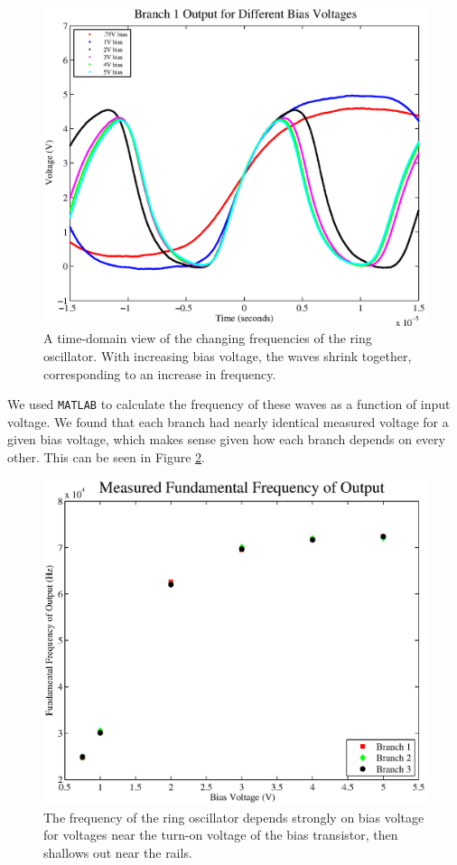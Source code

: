 \documentclass{article}
\begin{document}
\begin{figure}[H]
\centering
\includegraphics[scale=.6]{b1_out.eps}
\caption{A time-domain view of the changing frequencies of the ring oscillator. With increasing bias voltage, the waves shrink together, corresponding to an increase in frequency.}
\label{branch}
\end{figure}

We used \texttt{MATLAB} to calculate the frequency of these waves as a function of input voltage.  We found that each branch had nearly identical measured voltage for a given bias voltage, which makes sense given how each branch depends on every other.  This can be seen in Figure \ref{freqs}.

\begin{figure}[H]
\centering
\includegraphics[scale=.5]{freqs.eps}
\caption{The frequency of the ring oscillator depends strongly on bias voltage for voltages near the turn-on voltage of the bias transistor, then shallows out near the rails.}
\label{freqs}
\end{figure}
\end{document}
